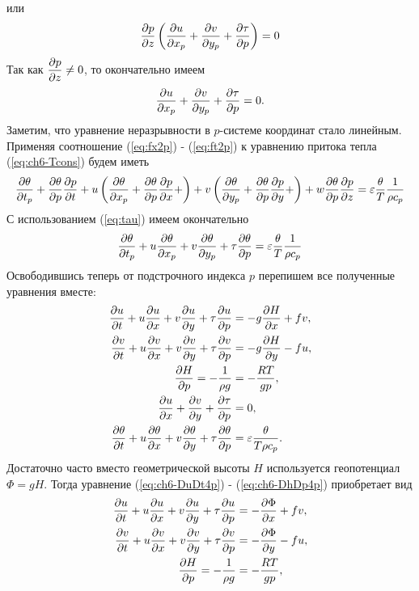    или
   \begin{equation*}
       \pd{p}{z} \left( \pd{u}{x_p} + \pd{v}{y_p} + \pd{\tau}{p}  \right) = 0
   \end{equation*}
   Так как $\pd{p}{z}\neq0$, то окончательно имеем
   \begin{equation}
       \pd{u}{x_p} + \pd{v}{y_p} + \pd{\tau}{p} = 0.
   \end{equation}
   Заметим, что уравнение неразрывности в $p$-системе координат стало линейным. Применяя соотношение (\ref{eq:fx2p}) - (\ref{eq:ft2p}) к уравнению притока тепла (\ref{eq:ch6-Tcons}) будем иметь
   \begin{multline*}
        \pd{\theta}{t_p} + 
        \pd{\theta}{p}\pd{p}{t}+u \left( \pd{\theta}{x_p} + \pd{\theta}{p}\pd{p}{x} + \right) + 
        v \left( \pd{\theta}{y_p} + \pd{\theta}{p}\pd{p}{y} + \right) + 
        w \pd{\theta}{p}\pd{p}{z} = \varepsilon\frac{\theta}{T}\frac{1}{\rho c_p}
   \end{multline*}
   С использованием (\ref{eq:tau}) имеем окончательно 
   \begin{equation}
       \label{eq:cp6-Tcons4p}
       \pd{\theta}{t_p} + u\pd{\theta}{x_p} + v\pd{\theta}{y_p} + \tau \pd{\theta}{p} = \varepsilon\frac{\theta}{T}\frac{1}{\rho c_p}
   \end{equation}
   Освободившись теперь от подстрочного индекса $p$ перепишем все полученные уравнения вместе:
   \begin{align}
        \pd{u}{t}+u\pd{u}{x}+v\pd{u}{y}+\tau\pd{u}{p} &= - g \pd{H}{x}+fv, \label{eq:ch6-DuDt4p} \\
        \pd{v}{t}+u\pd{v}{x}+v\pd{v}{y}+\tau\pd{v}{p} &= - g \pd{H}{y}-fu, \label{eq:ch6-DvDt4p} \\
        \pd{H}{p}=-\frac{1}{\rho g}&=-\frac{RT}{gp}, \label{eq:ch6-DhDp4p}\\
        \pd{u}{x} + \pd{v}{y} + \pd{\tau}{p} &= 0, \label{eq:ch6-masscons4p}\\
        \pd{\theta}{t} + u\pd{\theta}{x} + v\pd{\theta}{y} + \tau \pd{\theta}{p} &= \varepsilon\frac{\theta}{T \rho c_p}. \label{eq:ch6-DthetaDt4p}
   \end{align}
   Достаточно часто вместо геометрической высоты $H$ используется геопотенциал $\Phi=gH$. Тогда уравнение (\ref{eq:ch6-DuDt4p}) - (\ref{eq:ch6-DhDp4p}) приобретает вид
   \begin{align}
        \pd{u}{t}+u\pd{u}{x}+v\pd{u}{y}+\tau\pd{u}{p} &= - \pd{\Phi}{x}+fv, \label{eq:ch6-DuDt4pGeopot} \\
        \pd{v}{t}+u\pd{v}{x}+v\pd{v}{y}+\tau\pd{v}{p} &= -\pd{\Phi}{y}-fu, \label{eq:ch6-DvDt4pGeopot}\\
        \pd{H}{p}=-\frac{1}{\rho g}&=-\frac{RT}{gp}, \label{eq:ch6-DhDp4pGeopot}\\
   \end{align}
